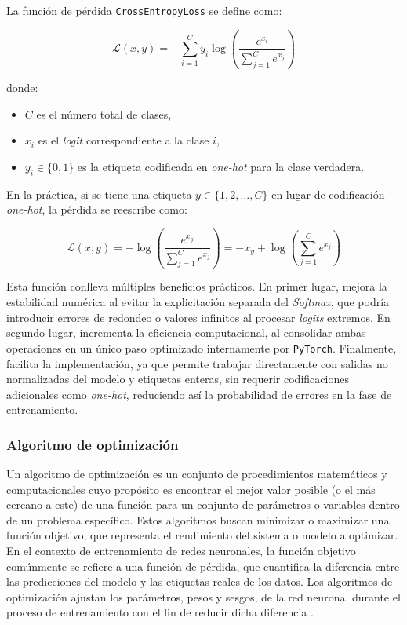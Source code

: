 La función de pérdida \texttt{CrossEntropyLoss} se define como:

\[
\mathcal{L}(x, y) = - \sum_{i=1}^{C} y_i \log \left( \frac{e^{x_i}}{\sum_{j=1}^{C} e^{x_j}} \right)
\]

donde:
\begin{itemize}
  \item \( C \) es el número total de clases,
  \item \( x_i \) es el \textit{logit} correspondiente a la clase \( i \),
  \item \( y_i \in \{0, 1\} \) es la etiqueta codificada en\textit{ one-hot} para la clase verdadera.
\end{itemize}

En la práctica, si se tiene una etiqueta \( y \in \{1, 2, \dots, C\} \) en lugar de codificación \textit{one-hot}, la pérdida se reescribe como:

\[
\mathcal{L}(x, y) = - \log \left( \frac{e^{x_{y}}}{\sum_{j=1}^{C} e^{x_j}} \right) = - x_{y} + \log \left( \sum_{j=1}^{C} e^{x_j} \right)
\]


Esta función conlleva múltiples beneficios prácticos. En primer lugar, mejora la estabilidad numérica al evitar la explicitación separada del \textit{Softmax}, que podría introducir errores de redondeo o valores infinitos al procesar \textit{logits} extremos. En segundo lugar, incrementa la eficiencia computacional, al consolidar ambas operaciones en un único paso optimizado internamente por \texttt{PyTorch}. Finalmente, facilita la implementación, ya que permite trabajar directamente con salidas no normalizadas del modelo y etiquetas enteras, sin requerir codificaciones adicionales como \textit{one-hot}, reduciendo así la probabilidad de errores en la fase de entrenamiento.



\subsubsection{Algoritmo de optimización}\label{sec:alg-opt}
Un algoritmo de optimización es un conjunto de procedimientos matemáticos y computacionales cuyo propósito es encontrar el mejor valor posible (o el más cercano a este) de una función para un conjunto de parámetros o variables dentro de un problema específico. Estos algoritmos buscan minimizar o maximizar una función objetivo, que representa el rendimiento del sistema o modelo a optimizar. En el contexto de entrenamiento de redes neuronales, la función objetivo comúnmente se refiere a una función de pérdida, que cuantifica la diferencia entre las predicciones del modelo y las etiquetas reales de los datos. Los algoritmos de optimización ajustan los parámetros, pesos y sesgos, de la red neuronal durante el proceso de entrenamiento con el fin de reducir dicha diferencia \cite{goodfellow2016deep}.


